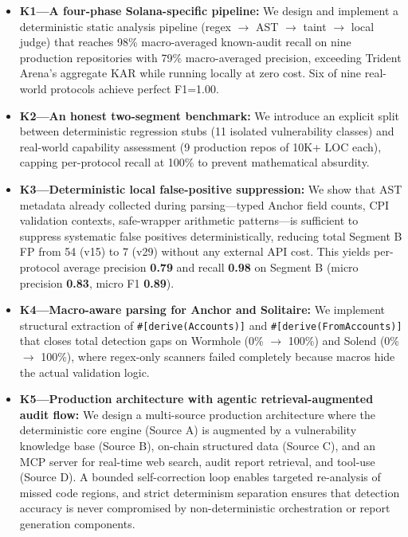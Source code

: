 \documentclass{article}
\begin{document}
\begin{itemize}
  \item \textbf{K1---A four-phase Solana-specific pipeline:} We design and implement a deterministic static analysis pipeline (regex $\to$ AST $\to$ taint $\to$ local judge) that reaches 98\% macro-averaged known-audit recall on nine production repositories with 79\% macro-averaged precision, exceeding Trident Arena's aggregate KAR while running locally at zero cost. Six of nine real-world protocols achieve perfect F1=1.00.

  \item \textbf{K2---An honest two-segment benchmark:} We introduce an explicit split between deterministic regression stubs (11 isolated vulnerability classes) and real-world capability assessment (9 production repos of 10K+ LOC each), capping per-protocol recall at 100\% to prevent mathematical absurdity.

  \item \textbf{K3---Deterministic local false-positive suppression:} We show that AST metadata already collected during parsing---typed Anchor field counts, CPI validation contexts, safe-wrapper arithmetic patterns---is sufficient to suppress systematic false positives deterministically, reducing total Segment B FP from 54 (v15) to 7 (v29) without any external API cost. This yields per-protocol average precision \textbf{0.79} and recall \textbf{0.98} on Segment B (micro precision \textbf{0.83}, micro F1 \textbf{0.89}).

  \item \textbf{K4---Macro-aware parsing for Anchor and Solitaire:} We implement structural extraction of \texttt{\#[derive(Accounts)]} and \texttt{\#[derive(FromAccounts)]} that closes total detection gaps on Wormhole (0\% $\to$ 100\%) and Solend (0\% $\to$ 100\%), where regex-only scanners failed completely because macros hide the actual validation logic.

  \item \textbf{K5---Production architecture with agentic retrieval-augmented audit flow:} We design a multi-source production architecture where the deterministic core engine (Source A) is augmented by a vulnerability knowledge base (Source B), on-chain structured data (Source C), and an MCP server for real-time web search, audit report retrieval, and tool-use (Source D). A bounded self-correction loop enables targeted re-analysis of missed code regions, and strict determinism separation ensures that detection accuracy is never compromised by non-deterministic orchestration or report generation components.
\end{itemize}
\end{document}
